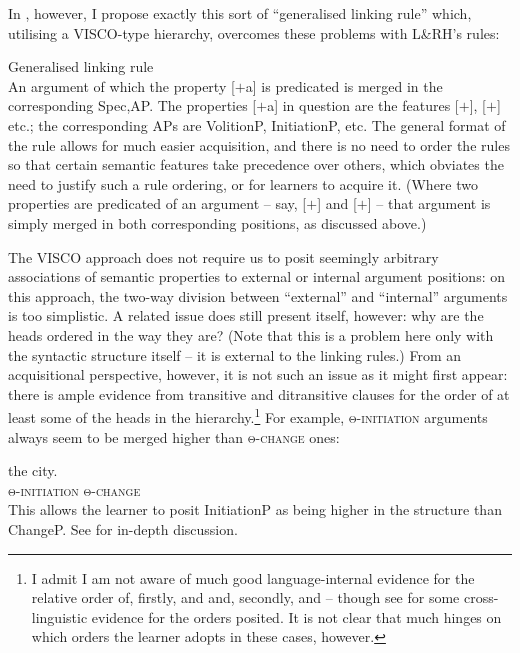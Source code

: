\documentclass[output=paper]{langsci/langscibook}
\begin{document}
In \textcite{Baker2018,Baker2019}, however, I propose exactly this sort of
\enquote{generalised linking rule} which, utilising a VISCO-type hierarchy,
overcomes these problems with L\&RH’s rules:

\ea Generalised linking rule\\An argument of which the property [$+$a]
    is predicated is merged in the corresponding Spec,AP.
\z
The properties [$+$a] in question are the features [$+$\Volition{}],
[$+$\Initiation{}] etc.; the corresponding APs are VolitionP, InitiationP, etc.
The general format of the rule allows for much easier acquisition, and there is
no need to order the rules so that certain semantic features take precedence
over others, which obviates the need to justify such a rule ordering, or for
learners to acquire it. (Where two properties are predicated of an argument –
say, [$+$\Initiation{}] and [$+$\Change{}] – that argument is simply merged in both
corresponding positions, as discussed above.)

The VISCO approach does not require us to posit seemingly arbitrary
associations of semantic properties to external or internal argument positions:
on this approach, the two-way division between \enquote{external} and
\enquote{internal} arguments is too simplistic. A related issue does still
present itself, however: why are the heads ordered in the way they are? (Note
that this is a problem here only with the syntactic structure itself – it is
external to the linking rules.) From an acquisitional perspective, however, it
is not such an issue as it might first appear: there is ample evidence from
transitive and ditransitive clauses for the order of at least some of the heads
in the hierarchy.\footnote{I admit I am not aware of much good
language-internal evidence for the relative order of, firstly, \Volition{} and
\Initiation{} and, secondly, \Change{} and \Oriented{} – though see  for some
cross-linguistic evidence for the orders posited. It is not clear that much
hinges on which orders the learner adopts in these cases, however.} For
example, \textsc{θ-initiation} arguments always seem to be merged
higher than \textsc{θ-change} ones:

\ea
     {the city}.\\
            \textsc{θ-initiation} \textsc{θ-change}\\
\z
This allows the learner to posit InitiationP as being higher in the structure
than ChangeP. See \citet{Baker2018} for in-depth discussion.
\end{document}
